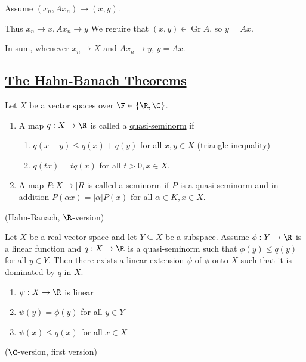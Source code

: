 \documentclass[x11names,reqno,14pt]{extarticle}
\begin{document}
Assume $(x_n, Ax_n) \to (x, y)$. 

Thus $x_n \to x, Ax_n \to y$
We reguire that $(x, y) \in \operatorname{Gr}A$, so $y = Ax$. 

In sum, whenever $x_n \to X$ and $Ax_n\to y$, $y = Ax$. 

\subsection*{\underline{The Hahn-Banach Theorems}}


Let $X$ be a vector spaces over $\F \in\{\R,\C\}$. 

\begin{enumerate}[label=(\alph*)]

\item A map $q:X\to\R$ is called a \underline{quasi-seminorm} if

\begin{enumerate}[label=(\roman*)]
\item $q(x + y) \leq q(x) + q(y)$ for all $x,y \in X$ (triangle inequality)

\item $q(tx) = tq(x)$ for all $t > 0, x \in X$. 
\end{enumerate}

\item A map $P:X\to|R$ is called a \underline{seminorm} if $P$ is a quasi-seminorm and in addition $P(\alpha x) = |\alpha|P(x)$ for all $\alpha\in K, x \in X$. 

\end{enumerate}

\thm (Hahn-Banach, $\R$-version)

Let $X$ be a real vector space and let $Y \subseteq X$ be a subspace. Assume $\phi:Y\to\R$ is a linear function and $q:X\to\R$ is a quasi-seminorm such that $\phi(y) \leq q(y)$ for all $y \in Y$. Then there exists a linear extension $\psi$ of $\phi$ onto $X$ such that it is dominated by $q$ in $X$. 

\begin{enumerate}[label=(\roman*)]
\item $\psi:X\to\R$ is linear
\item $\psi(y) = \phi(y)$ for all $y \in Y$
\item $\psi(x) \leq q(x)$ for all $x \in X$
\end{enumerate}

\thm($\C$-version, first version)
\end{document}
